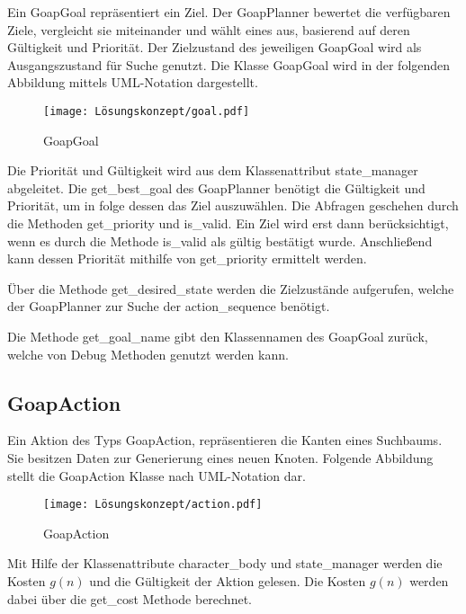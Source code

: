 Ein GoapGoal repräsentiert ein Ziel. Der GoapPlanner bewertet die verfügbaren Ziele, vergleicht sie miteinander und wählt eines aus, basierend auf deren Gültigkeit und Priorität. Der Zielzustand des jeweiligen GoapGoal wird als Ausgangszustand für Suche genutzt. Die Klasse GoapGoal wird in der folgenden Abbildung mittels UML-Notation dargestellt.

\begin{figure}[t]
  \centering
  \texttt{[image: Lösungskonzept/goal.pdf]}
	\captionsetup{justification=justified, format=plain}
  \caption{GoapGoal}
  \label{fig:GoapGoal}
\end{figure}

Die Priorität und Gültigkeit wird aus dem Klassenattribut state\_manager abgeleitet. Die get\_best\_goal des GoapPlanner benötigt die Gültigkeit und Priorität, um in folge dessen das Ziel auszuwählen. Die Abfragen geschehen durch die Methoden get\_priority und is\_valid. Ein Ziel wird erst dann berücksichtigt, wenn es durch die Methode is\_valid als gültig bestätigt wurde. Anschlie\ss{}end kann dessen Priorität mithilfe von get\_priority ermittelt werden. 

\"{U}ber die Methode get\_desired\_state werden die Zielzustände aufgerufen, welche der GoapPlanner zur Suche der action\_sequence benötigt. 

Die Methode get\_goal\_name gibt den Klassennamen des GoapGoal zurück, welche von Debug Methoden genutzt werden kann.


\subsection{GoapAction}
\label{chap:goapaction uml}

Ein Aktion des Typs GoapAction, repräsentieren die Kanten eines Suchbaums. Sie besitzen Daten zur Generierung eines neuen Knoten. Folgende Abbildung stellt die GoapAction Klasse nach UML-Notation dar.

\begin{figure}[h]
  \centering
  \texttt{[image: Lösungskonzept/action.pdf]}
	\captionsetup{justification=justified, format=plain}
  \caption{GoapAction}
  \label{fig:GoapAction}
\end{figure}

Mit Hilfe der Klassenattribute character\_body und state\_manager werden die Kosten $g(n)$ und die Gültigkeit der Aktion gelesen. Die Kosten $g(n)$ werden dabei über die get\_cost Methode berechnet.

